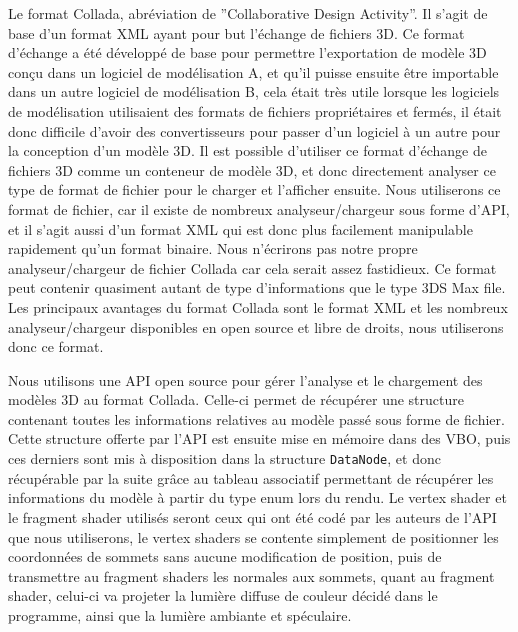 \documentclass[a4paper, 11pt]{article}
\begin{document}
Le format Collada, abréviation de ''Collaborative Design Activity''. Il s'agit de base d'un format XML ayant pour but l'échange de fichiers 3D. Ce format d'échange a été développé de base pour permettre l'exportation de modèle 3D conçu dans un logiciel de modélisation A, et qu'il puisse ensuite être importable dans un autre logiciel de modélisation B, cela était très utile lorsque les logiciels de modélisation utilisaient des formats de fichiers propriétaires et fermés, il était donc difficile d'avoir des convertisseurs pour passer d'un logiciel à un autre pour la conception d'un modèle 3D. Il est possible d'utiliser ce format d'échange de fichiers 3D comme un conteneur de modèle 3D, et donc directement analyser ce type de format de fichier pour le charger et l'afficher ensuite. Nous utiliserons ce format de fichier, car il existe de nombreux analyseur/chargeur sous forme d'API, et il s'agit aussi d'un format XML qui est donc plus facilement manipulable rapidement qu'un format binaire. Nous n'écrirons pas notre propre analyseur/chargeur de fichier Collada car cela serait assez fastidieux. Ce format peut contenir quasiment autant de type d'informations que le type 3DS Max file. Les principaux avantages du format Collada sont le format XML et les nombreux analyseur/chargeur disponibles en open source et libre de droits, nous utiliserons donc ce format.

Nous utilisons une API open source pour gérer l'analyse et le chargement des modèles 3D au format Collada. Celle-ci permet de récupérer une structure contenant toutes les informations relatives au modèle passé sous forme de fichier. Cette structure offerte par l'API est ensuite mise en mémoire dans des VBO, puis ces derniers sont mis à disposition dans la structure \texttt{DataNode}, et donc récupérable par la suite grâce au tableau associatif permettant de récupérer les informations du modèle à partir du type enum lors du rendu. Le vertex shader et le fragment shader utilisés seront ceux qui ont été codé par les auteurs de l'API que nous utiliserons, le vertex shaders se contente simplement de positionner les coordonnées de sommets sans aucune modification de position, puis de transmettre au fragment shaders les normales aux sommets, quant au fragment shader, celui-ci va projeter la lumière diffuse de couleur décidé dans le programme, ainsi que la lumière ambiante et spéculaire.
\end{document}
